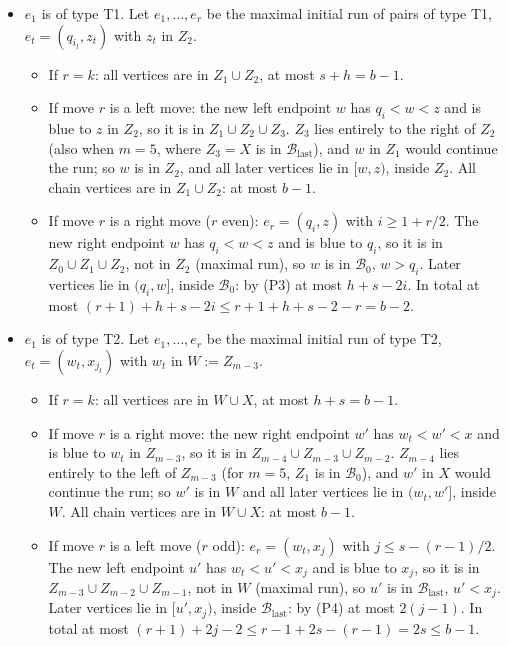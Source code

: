 \documentclass[11pt]{article}
\newcommand{\Bfirst}{\mathcal{B}_0}
\newcommand{\Blast}{\mathcal{B}_{\mathrm{last}}}
\theoremstyle{plain}
\theoremstyle{remark}
\begin{document}
\begin{itemize}
  \item[L1:] $e_1$ is of type T1. Let $e_1, \dots, e_r$ be the maximal initial run of pairs of type T1,
  $e_t = (q_{i_t}, z_t)$ with $z_t$ in $Z_2$.
  \begin{itemize}
    \item If $r = k$: all vertices are in $Z_1 \cup Z_2$, at most $s + h = b-1$.
    \item If move $r$ is a left move: the new left endpoint $w$ has $q_i < w < z$ and is blue to $z$ in $Z_2$, so
    it is in $Z_1 \cup Z_2 \cup Z_3$. $Z_3$ lies entirely to the right of $Z_2$ (also when $m = 5$, where
    $Z_3 = X$ is in $\Blast$), and $w$ in $Z_1$ would continue the run; so $w$ is in $Z_2$, and all later vertices
    lie in $[w, z)$, inside $Z_2$. All chain vertices are in $Z_1 \cup Z_2$: at most $b-1$.
    \item If move $r$ is a right move ($r$ even): $e_r = (q_i, z)$ with $i \geq 1 + r/2$. The new right endpoint
    $w$ has $q_i < w < z$ and is blue to $q_i$, so it is in $Z_0 \cup Z_1 \cup Z_2$, not in $Z_2$ (maximal run),
    so $w$ is in $\Bfirst$, $w > q_i$. Later vertices lie in $(q_i, w]$, inside $\Bfirst$: by (P3) at most
    $h+s-2i$. In total at most $(r+1) + h+s-2i \leq r+1+h+s-2-r = b-2$.
  \end{itemize}
  \item[L2:] $e_1$ is of type T2. Let $e_1, \dots, e_r$ be the maximal initial run of type T2,
  $e_t = (w_t, x_{j_t})$ with $w_t$ in $W := Z_{m-3}$.
  \begin{itemize}
    \item If $r = k$: all vertices are in $W \cup X$, at most $h + s = b-1$.
    \item If move $r$ is a right move: the new right endpoint $w'$ has $w_t < w' < x$ and is blue to $w_t$ in
    $Z_{m-3}$, so it is in $Z_{m-4} \cup Z_{m-3} \cup Z_{m-2}$. $Z_{m-4}$ lies entirely to the left of $Z_{m-3}$
    (for $m = 5$, $Z_1$ is in $\Bfirst$), and $w'$ in $X$ would continue the run; so $w'$ is in $W$ and all later
    vertices lie in $(w_t, w']$, inside $W$. All chain vertices are in $W \cup X$: at most $b-1$.
    \item If move $r$ is a left move ($r$ odd): $e_r = (w_t, x_j)$ with $j \leq s - (r-1)/2$. The new left
    endpoint $u'$ has $w_t < u' < x_j$ and is blue to $x_j$, so it is in $Z_{m-3} \cup Z_{m-2} \cup Z_{m-1}$, not
    in $W$ (maximal run), so $u'$ is in $\Blast$, $u' < x_j$. Later vertices lie in $[u', x_j)$, inside $\Blast$:
    by (P4) at most $2(j-1)$. In total at most $(r+1) + 2j - 2 \leq r - 1 + 2s - (r-1) = 2s \leq b-1$.
  \end{itemize}
\end{itemize}
\end{document}
